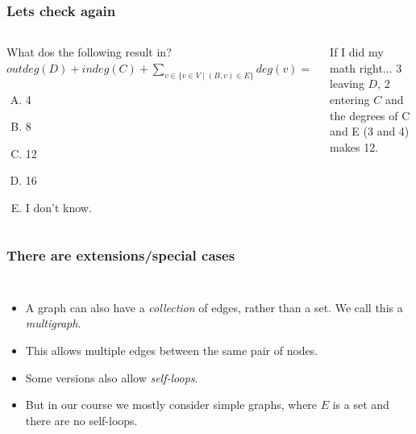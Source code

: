 \begin{frame}
	\frametitle{Lets check again}
	\begin{columns}
			
	\begin{block}{What dos the following result in?}
	\pause
		$\mathit{outdeg}(D) + \mathit{indeg}(C) + \sum\limits_{v\in \{v \in V \mid (B,v) \in E\}} \mathit{deg}(v) = $
		\begin{enumerate}[A.]
			\item 4
			\item 8
			\item 12
			\item 16
			\item I don't know.
		\end{enumerate}
	\end{block}
	\pause
	\begin{block}{If I did my math right...}
		3 leaving $D$, 2 entering $C$ and the degrees of C and E (3 and 4) makes 12.
	\end{block}
	\end{columns}
\end{frame}

\begin{frame}
	\frametitle{There are extensions/special cases}
	\begin{columns}
		\column{0.405\textwidth}
			
		\column{0.605\textwidth}
		\begin{itemize}
			\item A graph can also have a \textit{collection} of edges, rather than a set. We call this a \textit{multigraph}.
				\pause
			\item This allows multiple edges between the same pair of nodes.
				\pause
			\item Some versions also allow \textit{self-loops}.
				\pause
			\item But in our course we mostly consider \alert{simple} graphs, where $E$ is a set and there are no self-loops.
		\end{itemize}
	\end{columns}
\end{frame}

